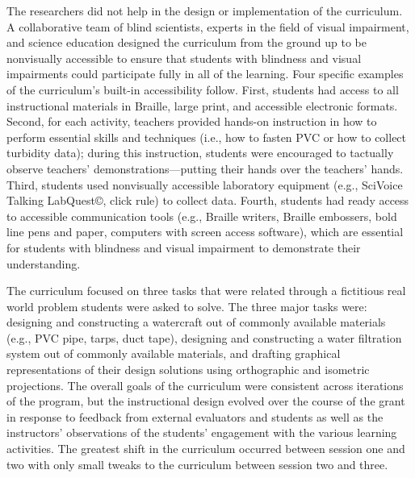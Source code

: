 \documentclass[11.5pt]{sig-alternate} %
\begin{document}
\begin{large}
The researchers did not help in the design or implementation of the curriculum. A collaborative team of blind scientists, experts in the field of visual impairment, and science education designed the curriculum from the ground up to be nonvisually accessible to ensure that students with blindness and visual impairments could participate fully in all of the learning. Four specific examples of the curriculum’s built-in accessibility follow. First, students had access to all instructional materials in Braille, large print, and accessible electronic formats. Second, for each activity, teachers provided hands-on instruction in how to perform essential skills and techniques (i.e., how to fasten PVC or how to collect turbidity data); during this instruction, students were encouraged to tactually observe teachers’ demonstrations—putting their hands over the teachers’ hands. Third, students used nonvisually accessible laboratory equipment (e.g., SciVoice Talking LabQuest©, click rule) to collect data. Fourth, students had ready access to accessible communication tools (e.g., Braille writers, Braille embossers, bold line pens and paper, computers with screen access software), which are essential for students with blindness and visual impairment to demonstrate their understanding.

The curriculum focused on three tasks that were related through a fictitious real world problem students were asked to solve. The three major tasks were: designing and constructing a watercraft out of commonly available materials (e.g., PVC pipe, tarps, duct tape), designing and constructing a water filtration system out of commonly available materials, and drafting graphical representations of their design solutions using orthographic and isometric projections. The overall goals of the curriculum were consistent across iterations of the program, but the instructional design evolved over the course of the grant in response to feedback from external evaluators and students as well as the instructors’ observations of the students’ engagement with the various learning activities. The greatest shift in the curriculum occurred between session one and two with only small tweaks to the curriculum between session two and three.  


\end{large}
\end{document}
